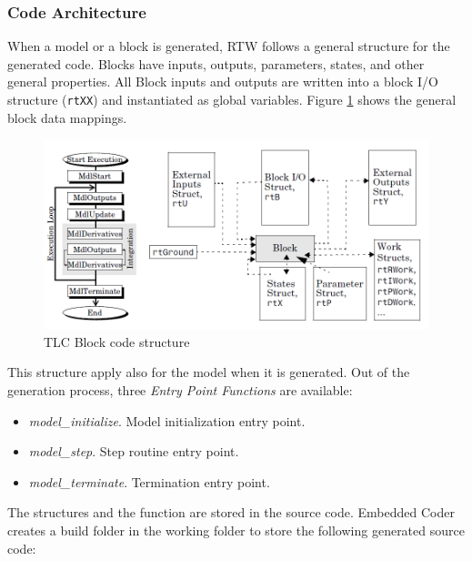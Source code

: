 \subsubsection{Code Architecture}
\label{sec:CodeArchitecture}
When a model or a block is generated, RTW follows a general structure for the generated code. Blocks have inputs, outputs, parameters, states, and other general properties. All Block inputs and outputs are written into a block I/O structure (\verb|rtXX|) and instantiated as global variables. Figure \ref{fig:TLCCodeStructure} shows the general block data mappings.
\begin{figure}[htbp] 
\centering    
\includegraphics[width=1.0\textwidth]{TLCCodeStructure}
\caption{TLC Block code structure}
\label{fig:TLCCodeStructure}
\end{figure}
This structure apply also for the model when it is generated. Out of the generation process, three \emph{Entry Point Functions} are available:%
\begin{itemize} 
\item \emph{model\_initialize}. Model initialization entry point.
\item \emph{model\_step}. Step routine entry point.
\item \emph{model\_terminate}. Termination entry point.
\end{itemize}
The structures and the function are stored in the source code. Embedded Coder creates a build folder in the working folder to store the following generated source code:
